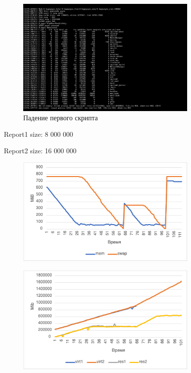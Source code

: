 \documentclass{article}
\begin{document}
\begin{figure}[H]
\centering
\includegraphics[width=0.8\textwidth]{images/6.png}
\caption{Падение первого скрипта}
\end{figure}

\hspace{4mm}
Report1 size: 8 000 000 

Report2 size: 16 000 000

\begin{figure}[H]
\centering
\includegraphics[width=0.8\textwidth]{images/7.png}
\caption{}
\end{figure}

\begin{figure}[H]
\centering
\includegraphics[width=0.8\textwidth]{images/8.png}
\caption{}
\end{figure}
\end{document}
